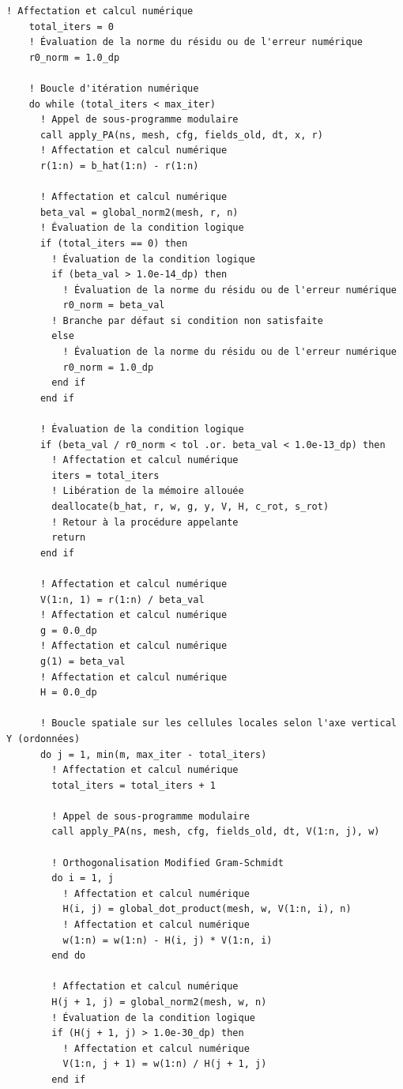\documentclass[10pt,a4paper,oneside]{book}
\begin{document}
\begin{lstlisting}[language={[95]Fortran}]
    ! Affectation et calcul numérique
    total_iters = 0
    ! Évaluation de la norme du résidu ou de l'erreur numérique
    r0_norm = 1.0_dp

    ! Boucle d'itération numérique
    do while (total_iters < max_iter)
      ! Appel de sous-programme modulaire
      call apply_PA(ns, mesh, cfg, fields_old, dt, x, r)
      ! Affectation et calcul numérique
      r(1:n) = b_hat(1:n) - r(1:n)

      ! Affectation et calcul numérique
      beta_val = global_norm2(mesh, r, n)
      ! Évaluation de la condition logique
      if (total_iters == 0) then
        ! Évaluation de la condition logique
        if (beta_val > 1.0e-14_dp) then
          ! Évaluation de la norme du résidu ou de l'erreur numérique
          r0_norm = beta_val
        ! Branche par défaut si condition non satisfaite
        else
          ! Évaluation de la norme du résidu ou de l'erreur numérique
          r0_norm = 1.0_dp
        end if
      end if

      ! Évaluation de la condition logique
      if (beta_val / r0_norm < tol .or. beta_val < 1.0e-13_dp) then
        ! Affectation et calcul numérique
        iters = total_iters
        ! Libération de la mémoire allouée
        deallocate(b_hat, r, w, g, y, V, H, c_rot, s_rot)
        ! Retour à la procédure appelante
        return
      end if

      ! Affectation et calcul numérique
      V(1:n, 1) = r(1:n) / beta_val
      ! Affectation et calcul numérique
      g = 0.0_dp
      ! Affectation et calcul numérique
      g(1) = beta_val
      ! Affectation et calcul numérique
      H = 0.0_dp

      ! Boucle spatiale sur les cellules locales selon l'axe vertical Y (ordonnées)
      do j = 1, min(m, max_iter - total_iters)
        ! Affectation et calcul numérique
        total_iters = total_iters + 1

        ! Appel de sous-programme modulaire
        call apply_PA(ns, mesh, cfg, fields_old, dt, V(1:n, j), w)

        ! Orthogonalisation Modified Gram-Schmidt
        do i = 1, j
          ! Affectation et calcul numérique
          H(i, j) = global_dot_product(mesh, w, V(1:n, i), n)
          ! Affectation et calcul numérique
          w(1:n) = w(1:n) - H(i, j) * V(1:n, i)
        end do

        ! Affectation et calcul numérique
        H(j + 1, j) = global_norm2(mesh, w, n)
        ! Évaluation de la condition logique
        if (H(j + 1, j) > 1.0e-30_dp) then
          ! Affectation et calcul numérique
          V(1:n, j + 1) = w(1:n) / H(j + 1, j)
        end if


\end{lstlisting}
\end{document}
